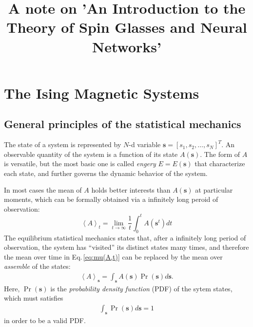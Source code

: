 \documentclass[11pt]{book}
\numberwithin{equation}{chapter}
\newcommand{\bs}{\boldsymbol}
\newcommand{\mean}[2]{\left\langle{#1}\right\rangle_{#2}}
\newcommand{\vs}{\bs{s}}
\newcommand{\vst}{\bs{\tilde{s}}}
\begin{document}
\title{A note on 'An Introduction to the Theory of Spin Glasses and Neural Networks'}
\maketitle
{}
\clearpage
\chapter{The Ising Magnetic Systems}
\section{General principles of the statistical mechanics}
\newcommand{\hf}{H}
\newcommand{\ef}{E}
\newcommand{\pf}{P}
\newcommand{\ps}{P(\vs)}
\newcommand{\pst}{\pf(\vst)}
\newcommand{\es}{\ef(\vs)}
\newcommand{\est}{\ef(\vst)}
\newcommand{\me}{\mathcal{\bs{\ef}}}
The state of a system is represented by $N$-d variable $\vs=[s_1, s_2, \dots, s_N]^T$. An observable quantity of the system is a function of its state $A(\vs)$. The form of $A$ is versatile, but the most basic one is called \textit{engery} $\ef = \ef(\vs)$ that characterize each state, and further governs the dynamic behavior of the system.

In most cases the mean of $A$ holds better interests than $A(\vs)$ at particular moments, which can be formally obtained via a infinitely long peroid of observation:
\begin{equation} \label{eq:mu(A,t)}
  \mean{A}{t} = \lim_{t \to \infty}\frac{1}{t} \int_0^t A(\vs^t) dt
\end{equation}
The equilibrium statistical mechanics states that, after a infinitely long period of observation, the system has ``visited'' its distinct states many times, and therefore the mean over time in Eq.\,\eqref{eq:mu(A,t)} can be replaced by the mean over \textit{assemble} of the states:
\begin{align}\label{eq:mu(A,s)}
  \mean{A}{\vs} = \int_{\vs} A(\vs)\Pr(\vs) d\vs.
\end{align}
Here, $\Pr(\vs)$ is the \textit{probability density function} (PDF) of the sytem states, which must satisfies
\begin{align}\label{eq:int(p)=1}
  \int_{\vs} \Pr(\vs) d\vs = 1
\end{align}
in order to be a valid PDF.
\end{document}
